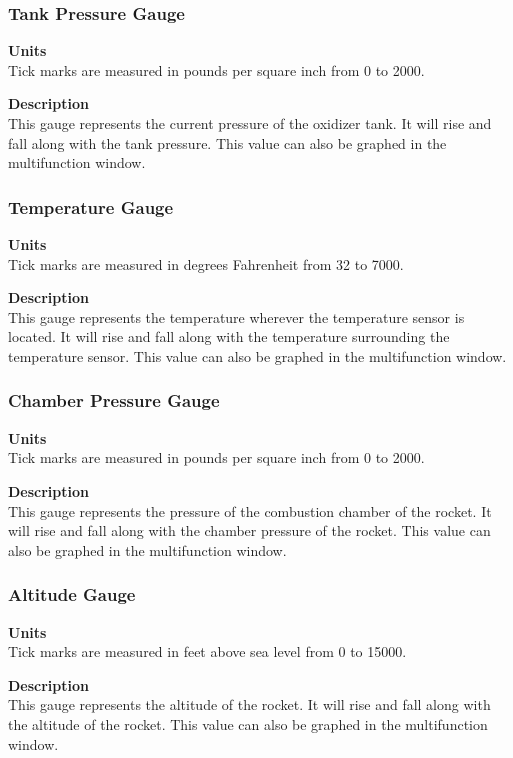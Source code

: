 \documentclass[10pt,draftclsnofoot,onecolumn,compsoc]{IEEEtran}
\begin{document}
\subsubsection{Tank Pressure Gauge}
{\bf Units} \\ Tick marks are measured in pounds per square inch from 0 to 2000.\par
{\bf Description} \\ This gauge represents the current pressure of the oxidizer tank. It will rise and fall along with the tank pressure. This value can also be graphed in the multifunction window.\par

\subsubsection{Temperature Gauge}
{\bf Units} \\ Tick marks are measured in degrees Fahrenheit from 32 to 7000.\par
{\bf Description} \\ This gauge represents the temperature wherever the temperature sensor is located. It will rise and fall along with the temperature surrounding the temperature sensor. This value can also be graphed in the multifunction window. \par

\subsubsection{Chamber Pressure Gauge}
{\bf Units} \\ Tick marks are measured in pounds per square inch from 0 to 2000.\par
{\bf Description} \\ This gauge represents the pressure of the combustion chamber of the rocket. It will rise and fall along with the chamber pressure of the rocket. This value can also be graphed in the multifunction window. \par

\subsubsection{Altitude Gauge}
{\bf Units} \\ Tick marks are measured in feet above sea level from 0 to 15000.\par
{\bf Description} \\ This gauge represents the altitude of the rocket. It will rise and fall along with the altitude of the rocket. This value can also be graphed in the multifunction window. \par
\end{document}
